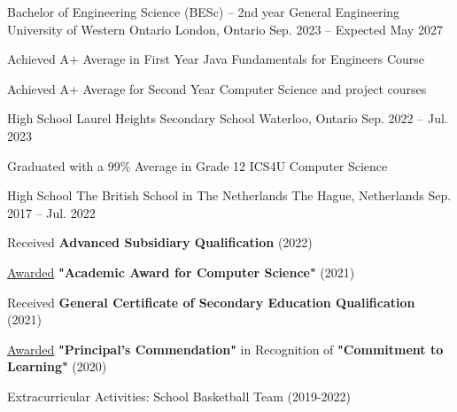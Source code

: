 


\begin{cventries}

  \cventry
    {Bachelor of Engineering Science (BESc) – 2nd year General Engineering} %
    {University of Western Ontario} %
    {London, Ontario} %
    {Sep. 2023 -- Expected May 2027} %
    {
      \begin{cvitems}
      \item{Achieved A+ Average in First Year Java Fundamentals for Engineers Course}
      \item{Achieved A+ Average for Second Year Computer Science and project courses}
      \end{cvitems}
    }


  \cventry
    {High School} %
    {Laurel Heights Secondary School} %
    {Waterloo, Ontario} %
    {Sep. 2022 -- Jul. 2023} %
    {
      \begin{cvitems}
      \item{Graduated with a 99\% Average in Grade 12 ICS4U Computer Science}
      \end{cvitems}
    }
    \vspace{5mm}

  \vspace{-\baselineskip}

  \cventry
    {High School} %
    {The British School in The Netherlands} %
    {The Hague, Netherlands} %
    {Sep. 2017 -- Jul. 2022} %
    {
      \begin{cvitems}
      \item {Received \textbf{Advanced Subsidiary Qualification} (2022)}
      \item {\underline{Awarded} \textbf{"Academic Award for Computer Science"} (2021)}
      \item {Received \textbf{General Certificate of Secondary Education Qualification} (2021)}
      \item {\underline{Awarded} \textbf{"Principal's Commendation"} in Recognition of \textbf{"Commitment to Learning"} (2020)}
      \item{Extracurricular Activities: School Basketball Team (2019-2022)}
      \end{cvitems}
    }
    \vspace{5mm}


\end{cventries}


